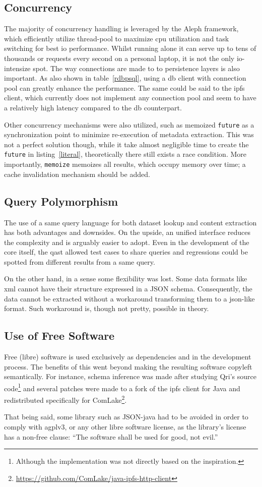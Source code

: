 \subsection{Concurrency}
The majority of concurrency handling is leveraged by the Aleph framework,
which efficiently utilize thread-pool to maximize \gls{cpu} utilization
and task switching for best \gls{io} performance.  Whilst running alone it can
serve up to tens of thousands or requests every second on a personal laptop,
it is not the only \gls{io}-intensize spot.  The way connections are made to
to persistence layers is also important.  As also shown in table~\ref{rdbpsql},
using a \gls{db} client with connection pool can greatly enhance
the performance.  The same could be said to the \gls{ipfs} client,
which currently does not implement any connection pool and seem to have
a relatively high latency compared to the \gls{db} counterpart.

Other concurrency mechanisms were also utilized, such as memoized \verb|future|
as a synchronization point to minimize re-execution of metadata extraction.
This was not a perfect solution though, while it take almost negligible time
to create the \verb|future| in listing~\ref{literal}, theoretically there still
exists a race condition.  More importantly, \verb|memoize| memoizes all results,
which occupy memory over time; a cache invalidation mechanism should be added.

\subsection{Query Polymorphism}
The use of a same query language for both dataset lookup and content extraction
has both advantages and downsides.  On the upside, an unified interface
reduces the complexity and is arguably easier to adopt.  Even in the development
of the core itself, the \gls{qast} allowed test cases to share queries
and regressions could be spotted from different results from a same query.

On the other hand, in a sense some flexibility was lost.  Some data formats
like \gls{xml} cannot have their structure expressed in a JSON schema.
Consequently, the data cannot be extracted without a workaround transforming
them to a \gls{json}-like format.  Such workaround is, though not pretty,
possible in theory.

\subsection{Use of Free Software}
Free (libre) software is used exclusively as dependencies and in the development
process.  The benefits of this went beyond making the resulting software
copyleft semantically.  For instance, schema inference was made after
studying Qri's source code\footnote{Although the implementation was not
directly based on the inspiration.} and several patches were made to a fork
of the \gls{ipfs} client for Java and redistributed specifically for
ComLake\footnote{\url{https://github.com/ComLake/java-ipfs-http-client}}.

That being said, some library such as JSON-java had to be avoided in order
to comply with \gls{agplv3}, or any other libre software license, as the
library's license has a non-free clause: ``The software shall be used for good,
not evil.''


